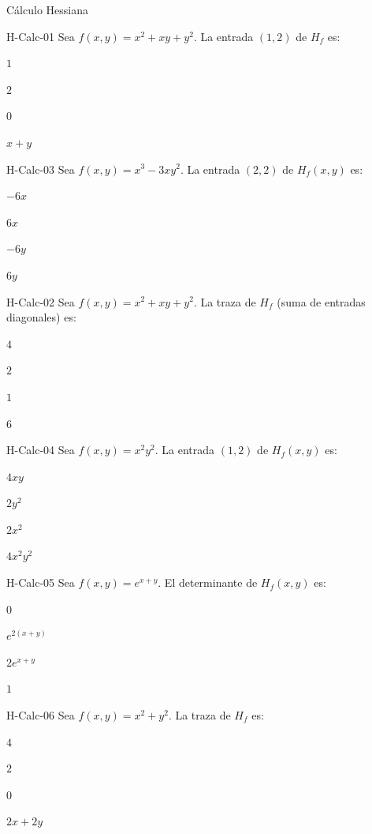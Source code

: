 \documentclass[a4,11pt]{aleph-notas}
\begin{document}
\begin{quiz}{Cálculo Hessiana}

\begin{multi}[]%
    {H-Calc-01}
    Sea $f(x,y) = x^2 + xy + y^2$. La entrada $(1,2)$ de $H_f$ es:
    \item* $1$
    \item $2$
    \item $0$
    \item $x+y$
\end{multi}

\begin{multi}[]%
    {H-Calc-03}
    Sea $f(x,y) = x^3 - 3xy^2$. La entrada $(2,2)$ de $H_f(x,y)$ es:
    \item* $-6x$
    \item $6x$
    \item $-6y$
    \item $6y$
\end{multi}

\begin{multi}[]%
    {H-Calc-02}
    Sea $f(x,y) = x^2 + xy + y^2$. La traza de $H_f$ (suma de entradas diagonales) es:
    \item* $4$
    \item $2$
    \item $1$
    \item $6$
\end{multi}

\begin{multi}[]%
    {H-Calc-04}
    Sea $f(x,y) = x^2 y^2$. La entrada $(1,2)$ de $H_f(x,y)$ es:
    \item* $4xy$
    \item $2y^2$
    \item $2x^2$
    \item $4x^2y^2$
\end{multi}

\begin{multi}[]%
    {H-Calc-05}
    Sea $f(x,y) = e^{x+y}$. El determinante de $H_f(x,y)$ es:
    \item* $0$
    \item $e^{2(x+y)}$
    \item $2e^{x+y}$
    \item $1$
\end{multi}

\begin{multi}[]%
    {H-Calc-06}
    Sea $f(x,y) = x^2 + y^2$. La traza de $H_f$ es:
    \item* $4$
    \item $2$
    \item $0$
    \item $2x + 2y$
\end{multi}


\end{quiz}
\end{document}
